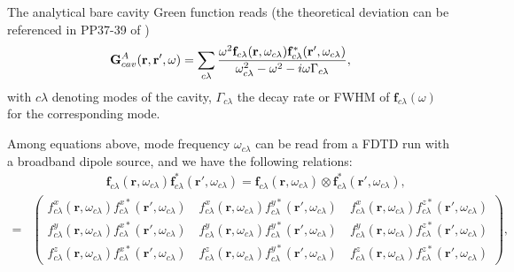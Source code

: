 The analytical bare cavity Green function reads (the theoretical deviation can be referenced in PP37-39 of \cite{Sakoda2005})
\begin{equation}
 \label{Gcav}
\mathbf{G}^{A}_{cav}(\mathbf{r},\mathbf{r}',\omega)
=\sum_{c\lambda}{\frac{\omega^2\mathbf{f}_{c\lambda}(\mathbf{r},\omega_{c\lambda})\mathbf{f}_{c\lambda}^*(\mathbf{r}',\omega_{c\lambda})}
{\omega_{c\lambda}^2-\omega^2-i\omega\Gamma_{c\lambda}}},
\end{equation}
with $c\lambda$ denoting modes of the cavity, $\Gamma_{c\lambda}$ the decay rate or FWHM of $\mathbf{f}_{c\lambda}(\omega)$ for the corresponding mode.

Among equations above, mode frequency $\omega_{c\lambda}$ can be read from a FDTD run with a broadband dipole source,
and we have the following relations:
\begin{subequations}
\begin{align}
  {}& \quad \quad \quad \quad \quad \quad \mathbf{f}_{c\lambda}(\mathbf{r},\omega_{c\lambda})\mathbf{f}_{c\lambda}^*(\mathbf{r}',\omega_{c\lambda})
= \mathbf{f}_{c\lambda}(\mathbf{r},\omega_{c\lambda}) \otimes \mathbf{f}_{c\lambda}^*(\mathbf{r}',\omega_{c\lambda}),\\
=& \! \left( \! \begin{array}{c}
               f_{c\lambda}^x(\mathbf{r},\omega_{c\lambda})f_{c\lambda}^{x*}(\mathbf{r}',\omega_{c\lambda}) \quad
                 f_{c\lambda}^x(\mathbf{r},\omega_{c\lambda})f_{c\lambda}^{y*}(\mathbf{r}',\omega_{c\lambda}) \quad
                 f_{c\lambda}^x(\mathbf{r},\omega_{c\lambda})f_{c\lambda}^{z*}(\mathbf{r}',\omega_{c\lambda}) \\
               f_{c\lambda}^y(\mathbf{r},\omega_{c\lambda}){f}_{c\lambda}^{x*}(\mathbf{r}',\omega_{c\lambda}) \quad
                 f_{c\lambda}^y(\mathbf{r},\omega_{c\lambda}){f}_{c\lambda}^{y*}(\mathbf{r}',\omega_{c\lambda}) \quad
                 f_{c\lambda}^y(\mathbf{r},\omega_{c\lambda}){f}_{c\lambda}^{z*}(\mathbf{r}',\omega_{c\lambda}) \\
               f_{c\lambda}^z(\mathbf{r},\omega_{c\lambda}){f}_{c\lambda}^{x*}(\mathbf{r}',\omega_{c\lambda}) \quad
                 f_{c\lambda}^z(\mathbf{r},\omega_{c\lambda}){f}_{c\lambda}^{y*}(\mathbf{r}',\omega_{c\lambda}) \quad
                 f_{c\lambda}^z(\mathbf{r},\omega_{c\lambda}){f}_{c\lambda}^{z*}(\mathbf{r}',\omega_{c\lambda})
              \end{array} \! \right) \! \label{fmatrix},
\end{align}
\end{subequations}
